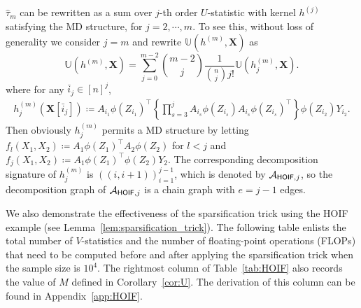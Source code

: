 \documentclass[letterpaper,11pt]{article}
\newcommand{\libref}[2]{\href{#2}{\texttt{#1}}}
\newcommand{\ustat}{\mathbb{U}}
\newcommand{\ustatp}[2]{\ustat(#1,#2)}
\newcommand{\less}{O}
\newcommand{\opteinsum}{\libref{opt-einsum}{https://dgasmith.github.io/opt_einsum/}}
\begin{document}
\begin{bibunit}[plainnat]
$\hat{\tau}_{m}$ can be rewritten as a sum over $j$-th order $U$-statistic with kernel $h^{(j)}$ satisfying the MD structure, for $j = 2, \cdots, m$. To see this, without loss of generality we consider $j = m$ and rewrite $\ustat (h^{(m)}, \bm{X})$ as
\begin{equation*}
\ustatp{h^{(m)}}{\bm{X}} = \sum_{j=0}^{m-2} \binom{m-2}{j} \frac{1}{\binom{n}{j} j!}  \ustatp{h_j^{(m)}}{\bm{X}}.
\end{equation*}
where for any $\bar{i}_{j} \in [n]^j$, 
\begin{align} 
\label{eq:hoif_kernel}
h_j^{(m)} (\bm{X}[\bar{i}_{j}]) \coloneqq A_{i_1} \phi (Z_{i_1})^{\top} \left\{ \prod_{s = 3}^{j} A_{i_s} \phi (Z_{i_s}) A_{i_s} \phi (Z_{i_s})^{\top} \right\} \phi (Z_{i_2}) Y_{i_2}.
\end{align}
Then obviously $h_j^{(m)}$ permits a MD structure by letting $f_{l} (X_1, X_2) \coloneqq A_1 \phi (Z_1)^{\top} A_2 \phi (Z_2)$ for $l < j$ and $f_{j} (X_1, X_2) \coloneqq A_1 \phi (Z_1)^{\top} \phi (Z_2) Y_2 $. The corresponding decomposition signature of $h_j^{(m)}$ is $((i, i+1))_{i=1}^{j-1}$, which is denoted by ${\mathcal{A}}_{\mathsf{HOIF},j}$, so the decomposition graph of ${\mathcal{A}}_{\mathsf{HOIF},j}$ is a chain graph with $e = j - 1$ edges.

We also demonstrate the effectiveness of the sparsification trick using the HOIF example (see Lemma~\ref{lem:sparsification_trick}). The following table enlists the total number of $V$-statistics and the number of floating-point operations (FLOPs) that need to be computed before and after applying the sparsification trick when the sample size is $10^4$. The rightmost column of Table~\ref{tab:HOIF} also records the value of $M$ defined in Corollary~\ref{cor:U}. The derivation of this column can be found in Appendix~\ref{app:HOIF}. 




\end{bibunit}
\end{document}
